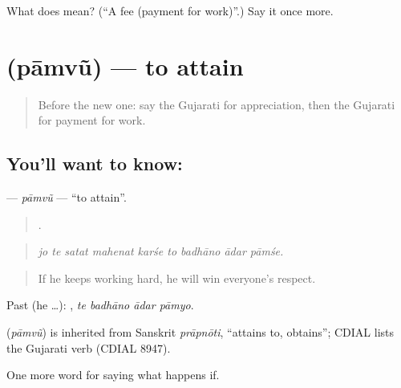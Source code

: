 \begin{tcolorbox}[breakable,colback=teal!4,colframe=teal!35!black,title={Before you move on}]
What does  mean? (\textquotedblleft{}A fee (payment for work)\textquotedblright{}.) Say it once more.
\end{tcolorbox}
\section[\texorpdfstring{\gu{પામવું} (pāmvũ)}{પામવું (pāmvũ)}]{ (pāmvũ) — to attain}

\label{lesson:GU-C385-pamvu}



\begin{quote}
Before the new one: say the Gujarati for appreciation, then the Gujarati for payment for work.
\end{quote}

\subsection*{You'll want to know: }
\textbf{} — \emph{pāmvũ} — \textquotedblleft{}to attain\textquotedblright{}.

\begin{quote}
        .
\end{quote}

\begin{quote}
\emph{jo te satat mahenat karśe to badhāno ādar pāmśe.}
\end{quote}

\begin{quote}
If he keeps working hard, he will win everyone's respect.
\end{quote}

Past (he …):    , \emph{te badhāno ādar pāmyo}.

\begin{cousinweb}
\textbf{} (\emph{pāmvũ}) is inherited from Sanskrit \emph{prāpnōti}, \textquotedblleft{}attains to, obtains\textquotedblright{}; CDIAL lists the Gujarati verb (CDIAL 8947).
\end{cousinweb}

\begin{grammarlens}[title={What you've built}]
One more word for saying what happens if.
\end{grammarlens}

